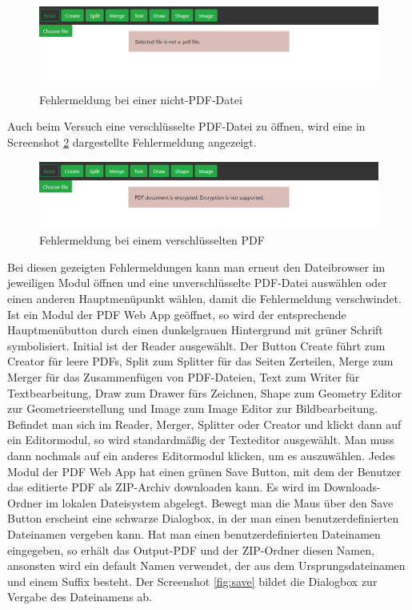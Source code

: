 \begin{figure}[!htbp]
	\centering
	\includegraphics[width=1\textwidth]{"images/errorfile.png"}
	\caption{Fehlermeldung bei einer nicht-PDF-Datei}
	\label{fig:errorfile}
\end{figure}

Auch beim Versuch eine verschlüsselte PDF-Datei zu öffnen, wird eine in Screenshot \ref{fig:errorcrypt} dargestellte Fehlermeldung angezeigt.

\begin{figure}[!htbp]
	\centering
	\includegraphics[width=1\textwidth]{"images/errorcrypt.png"}
	\caption{Fehlermeldung bei einem verschlüsselten PDF}
	\label{fig:errorcrypt}
\end{figure}

Bei diesen gezeigten Fehlermeldungen kann man erneut den Dateibrowser im jeweiligen Modul öffnen und eine unverschlüsselte PDF-Datei auswählen oder einen anderen Hauptmenüpunkt wählen, damit die Fehlermeldung verschwindet. \\
Ist ein Modul der PDF Web App geöffnet, so wird der entsprechende Hauptmenübutton durch einen dunkelgrauen Hintergrund mit grüner Schrift symbolisiert. Initial ist der Reader ausgewählt. Der Button Create führt zum Creator für leere PDFs, Split zum Splitter für das Seiten Zerteilen, Merge zum Merger für das Zusammenfügen von PDF-Dateien, Text zum Writer für Textbearbeitung, Draw zum Drawer fürs Zeichnen, Shape zum Geometry Editor zur Geometrieerstellung und Image zum Image Editor zur Bildbearbeitung. Befindet man sich im Reader, Merger, Splitter oder Creator und klickt dann auf ein Editormodul, so wird standardmäßig der Texteditor ausgewählt. Man muss dann nochmals auf ein anderes Editormodul klicken, um es auszuwählen. Jedes Modul der PDF Web App hat einen grünen Save Button, mit dem der Benutzer das editierte PDF als ZIP-Archiv downloaden kann. Es wird im Downloads-Ordner im lokalen Dateisystem abgelegt. Bewegt man die Maus über den Save Button erscheint eine schwarze Dialogbox, in der man einen benutzerdefinierten Dateinamen vergeben kann. Hat man einen benutzerdefinierten Dateinamen eingegeben, so erhält das Output-PDF und der ZIP-Ordner diesen Namen, ansonsten wird ein default Namen verwendet, der aus dem Ursprungsdateinamen und einem Suffix besteht. Der Screenshot \ref{fig:save} bildet die Dialogbox zur Vergabe des Dateinamens ab. 

